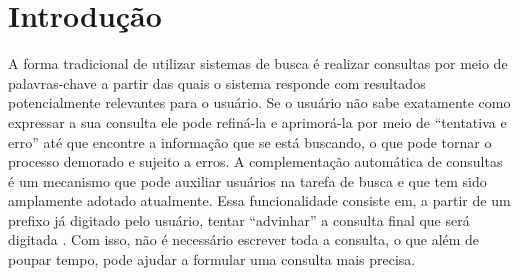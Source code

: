 \chapter{Introdução}

A forma tradicional de utilizar sistemas de busca é realizar consultas por meio de palavras-chave a partir das quais o sistema responde com resultados potencialmente relevantes para o usuário. Se o usuário não sabe exatamente como expressar a sua consulta ele pode refiná-la e aprimorá-la por meio de ``tentativa e erro'' até que encontre a informação que se está buscando, o que pode tornar o processo demorado e sujeito a erros. A complementação automática de consultas é um mecanismo que pode auxiliar usuários na tarefa de busca e que tem sido amplamente adotado atualmente. Essa funcionalidade consiste em, a partir de um prefixo já digitado pelo usuário, tentar ``advinhar'' a consulta final que será digitada \citep{santo2015}. Com isso, não é necessário escrever toda a consulta, o que além de poupar tempo, pode ajudar a formular uma consulta mais precisa.


